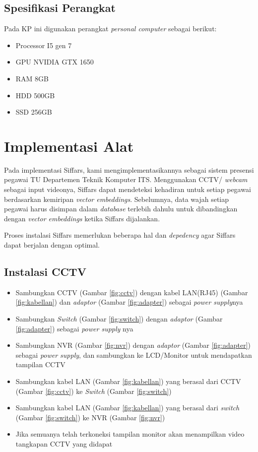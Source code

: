 \subsection{Spesifikasi Perangkat}
Pada KP ini digunakan perangkat \textit{personal computer} sebagai berikut:
\begin{itemize}
  \item Processor I5 gen 7
  \item GPU NVIDIA GTX 1650
  \item RAM 8GB
  \item HDD 500GB
  \item SSD 256GB
\end{itemize}

\section{Implementasi Alat}

Pada implementasi Siffars, kami mengimplementasikannya sebagai sistem presensi pegawai TU Departemen
Teknik Komputer ITS. Menggunakan CCTV/ \textit{webcam} sebagai input videonya, Siffars dapat mendeteksi kehadiran untuk
setiap pegawai berdasarkan kemiripan \textit{vector embeddings}. Sebelumnya, data wajah setiap pegawai harus
disimpan dalam \textit{database} terlebih dahulu untuk dibandingkan dengan \textit{vector embeddings} ketika Siffars dijalankan.

Proses instalasi Siffars memerlukan beberapa hal dan \textit{depedency} agar Siffars dapat berjalan dengan optimal.

\subsection{Instalasi CCTV}
\begin{itemize}
  \item Sambungkan CCTV (Gambar \ref{fig:cctv}) dengan kabel LAN(RJ45) (Gambar \ref{fig:kabellan}) dan \textit{adaptor} (Gambar \ref{fig:adapter}) sebagai \textit{power supply}nya
  \item Sambungkan \textit{Switch} (Gambar \ref{fig:switch}) dengan \textit{adaptor} (Gambar \ref{fig:adapter}) sebagai \textit{power supply} nya
  \item Sambungkan NVR (Gambar \ref{fig:nvr}) dengan \textit{adaptor} (Gambar \ref{fig:adapter}) sebagai \textit{power supply}, dan sambungkan ke LCD/Monitor untuk mendapatkan tampilan CCTV
  \item Sambungkan kabel LAN (Gambar \ref{fig:kabellan}) yang berasal dari CCTV (Gambar \ref{fig:cctv}) ke \textit{Switch} (Gambar \ref{fig:switch})
  \item Sambungkan kabel LAN (Gambar \ref{fig:kabellan}) yang berasal dari \textit{switch} (Gambar \ref{fig:switch}) ke NVR (Gambar \ref{fig:nvr})
  \item Jika semuanya telah terkoneksi tampilan monitor akan menampilkan video tangkapan CCTV yang didapat
\end{itemize}

